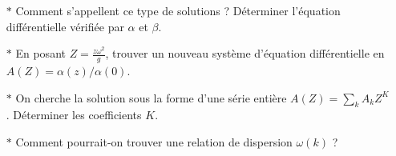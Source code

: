 \documentclass{report}
\begin{document}
\begin{itemize}
	
		\item[$\ast$] Comment s'appellent ce type de solutions ? Déterminer l'équation différentielle vérifiée par $\alpha$ et $\beta$.
		
		\item[$\ast$] En posant $Z=\frac{z\omega^2}{g}$, trouver un nouveau système d'équation différentielle en $A(Z)=\alpha(z)/\alpha(0)$. 
		
		\item[$\ast$] On cherche la solution sous la forme d'une série entière $A(Z)=\sum_k A_k Z^K$. Déterminer les coefficients $K$. 
		
		\item[$\ast$] Comment pourrait-on trouver une relation de dispersion $\omega(k)$ ?
		
\end{itemize}
\end{document}
